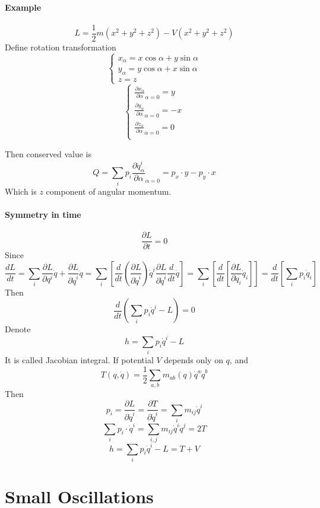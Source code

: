 \paragraph{Example}
$$L = \frac{1}{2}m (x^2+y^2+z^2) - V(x^2+y^2+z^2)$$
Define rotation transformation
$$\begin{cases}
x_\alpha = x\cos \alpha + y\sin \alpha\\
y_\alpha = y\cos \alpha + x\sin \alpha\\
z= z
\end{cases}$$
$$\begin{cases}
\frac{\partial x_\alpha}{\partial \alpha}_{\alpha = 0} = y\\
\frac{\partial y_\alpha}{\partial \alpha}_{\alpha = 0} = -x\\
\frac{\partial z_\alpha}{\partial \alpha}_{\alpha = 0} = 0\\
\end{cases}$$

Then conserved value is
$$Q = \sum_i p_i \frac{\partial \dot{q}^i_\alpha}{\partial \alpha}_{\alpha = 0} = p_x \cdot y  - p_y \cdot x$$
Which is $z$ component of angular momentum.
\paragraph{Symmetry in time}
$$\frac{\partial L}{\partial t} = 0$$
Since
$$\frac{d L}{d t} = \sum_i \frac{\partial L}{\partial q^i} \dot{q} +  \frac{\partial L}{\partial \dot{q}^i} \ddot{q} = \sum_i \left[ \frac{d}{dt}  \left( \frac{\partial L}{\partial \dot{q}^i} \right) \dot{q}^i   \frac{\partial L}{\partial \dot{q}^i} \frac{d}{dt}\dot{q} \right] = \sum_i \left[ \frac{d}{dt} \left[ \frac{\partial L}{\partial \dot{q}_i}\dot{q}_i \right] \right] = \frac{d}{dt} \left[ \sum_i p_i \dot{q}_i \right]$$
Then
$$\frac{d}{dt} \left( \sum_i p_i \dot{q}^i - L \right) = 0$$
Denote
$$h = \sum_i p_i \dot{q}^i - L $$
It is called Jacobian integral.
If potential $V$ depends only on $q$, and
$$T(q, \dot{q}) = \frac{1}{2} \sum_{a,b} m_{ab}(q) \dot{q}^a \dot{q}^b$$
Then
$$p_i = \frac{\partial L}{\partial \dot{q}^i} = \frac{\partial T}{\partial \dot{q}^i} = \sum_i m_{ij} \dot{q}^i$$
$$\sum_i p_i \cdot \dot{q}^i  = \sum_{i,j} m_{ij} \dot{q}^i \dot{q}^j = 2T$$
$$h = \sum_i p_i \dot{q}^i - L = T + V$$
\section{Small Oscillations }
